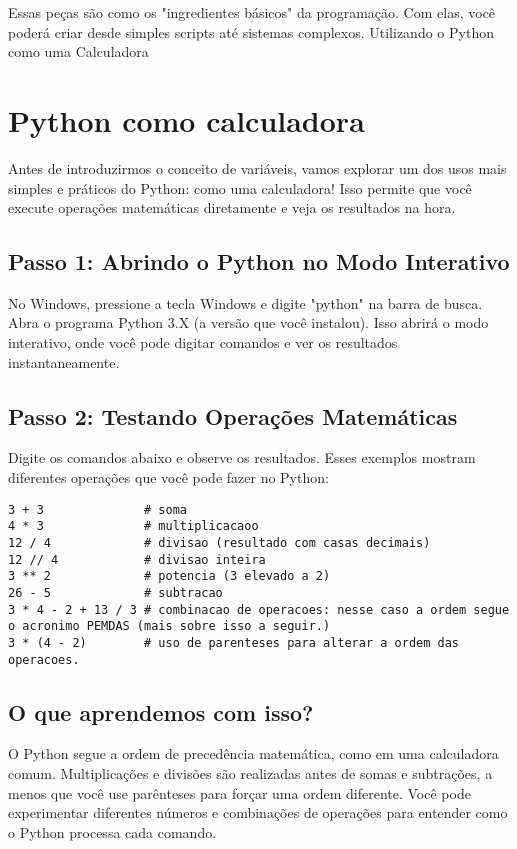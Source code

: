 \documentclass[12pt]{book}
\begin{document}
	Essas peças são como os "ingredientes básicos" da programação. Com elas, você poderá criar desde simples scripts até sistemas complexos.
	Utilizando o Python como uma Calculadora
	
	\section{Python como calculadora}
	
	Antes de introduzirmos o conceito de variáveis, vamos explorar um dos usos mais simples e práticos do Python: como uma calculadora! Isso permite que você execute operações matemáticas diretamente e veja os resultados na hora.
	\subsection{Passo 1: Abrindo o Python no Modo Interativo}
	
	No Windows, pressione a tecla Windows e digite "python" na barra de busca. Abra o programa Python 3.X (a versão que você instalou). Isso abrirá o modo interativo, onde você pode digitar comandos e ver os resultados instantaneamente.
	\subsection{Passo 2: Testando Operações Matemáticas}
	
	Digite os comandos abaixo e observe os resultados. Esses exemplos mostram diferentes operações que você pode fazer no Python:
	\begin{lstlisting}[caption={Python como calculadora.}]
3 + 3              # soma
4 * 3              # multiplicacaoo
12 / 4             # divisao (resultado com casas decimais)
12 // 4            # divisao inteira
3 ** 2             # potencia (3 elevado a 2)
26 - 5             # subtracao
3 * 4 - 2 + 13 / 3 # combinacao de operacoes: nesse caso a ordem segue o acronimo PEMDAS (mais sobre isso a seguir.)
3 * (4 - 2)        # uso de parenteses para alterar a ordem das operacoes.\end{lstlisting}
	
	\subsection{O que aprendemos com isso?}
	
	O Python segue a ordem de precedência matemática, como em uma calculadora comum. Multiplicações e divisões são realizadas antes de somas e subtrações, a menos que você use parênteses para forçar uma ordem diferente.\newline
	Você pode experimentar diferentes números e combinações de operações para entender como o Python processa cada comando.
	
\end{document}
